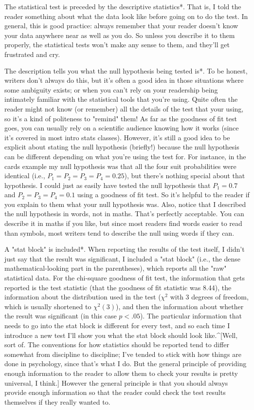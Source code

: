 \item *The statistical test is preceded by the descriptive statistics*. That is, I told the reader something about what the data look like before going on to do the test. In general, this is good practice: always remember that your reader doesn't know your data anywhere near as well as you do. So unless you describe it to them properly, the statistical tests won't make any sense to them, and they'll get frustrated and cry.
\item *The description tells you what the null hypothesis being tested is*. To be honest, writers don't always do this, but it's often a good idea in those situations where some ambiguity exists; or when you can't rely on your readership being intimately familiar with the statistical tools that you're using. Quite often the reader might not know (or remember) all the details of the test that your using, so it's a kind of politeness to "remind" them! As far as the goodness of fit test goes, you can usually rely on a scientific audience knowing how it works (since it's covered in most intro stats classes). However, it's still a good idea to be explicit about stating the null hypothesis (briefly!) because the null hypothesis can be different depending on what you're using the test for. For instance, in the cards example my null hypothesis was that all the four suit probabilities were identical (i.e., $P_1 = P_2 = P_3 = P_4 = 0.25$), but there's nothing special about that hypothesis. I could just as easily have tested the null hypothesis that $P_1 = 0.7$ and $P_2 = P_3 = P_4 = 0.1$ using a goodness of fit test. So it's helpful to the reader if you explain to them what your null hypothesis was. Also, notice that I described the null hypothesis in words, not in maths. That's perfectly acceptable. You can describe it in maths if you like, but since most readers find words easier to read than symbols, most writers tend to describe the null using words if they can.
\item *A "stat block" is included*. When reporting the results of the test itself, I didn't just say that the result was significant, I included a "stat block" (i.e., the dense mathematical-looking part in the parentheses), which reports all the "raw" statistical data. For the chi-square goodness of fit test, the information that gets reported is the test statistic (that the goodness of fit statistic was 8.44), the information about the distribution used in the test ($\chi^2$ with 3 degrees of freedom, which is usually shortened to $\chi^2(3)$), and then the information about whether the result was significant (in this case $p<.05$). The particular information that needs to go into the stat block is different for every test, and so each time I introduce a new test I'll show you what the stat block should look like.^[Well, sort of. The conventions for how statistics should be reported tend to differ somewhat from discipline to discipline; I've tended to stick with how things are done in psychology, since that's what I do. But the general principle of providing enough information to the reader to allow them to check your results is pretty universal, I think.] However the general principle is that you should always provide enough information so that the reader could check the test results themselves if they really wanted to. 
